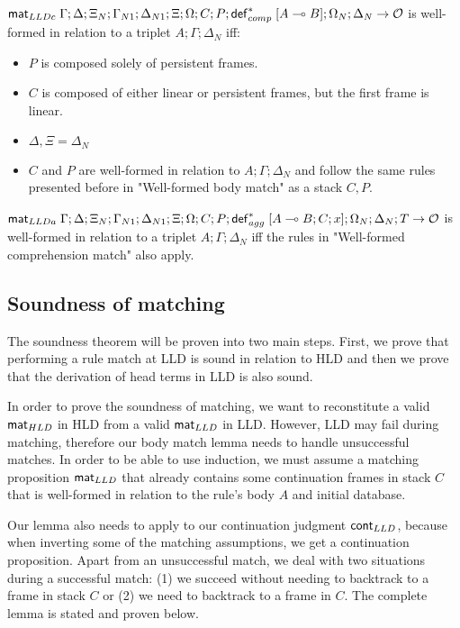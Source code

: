 \begin{definition}
$\mathsf{mat}_{LLDc} \; \Gamma; \Delta; \Xi_N; \Gamma_{N1}; \Delta_{N1}; \Xi; \Omega; C; P;
\mathsf{def}_{comp}^{*} \; [A \multimap B]; \Omega_N; \Delta_N \rightarrow \mathcal{O}$ is
well-formed in relation to a triplet $A; \Gamma; \Delta_{N}$ iff:

\begin{itemize}[leftmargin=*]
   \item $P$ is composed solely of persistent frames.
   \item $C$ is composed of either linear or persistent frames, but the first
   frame is linear.
   \item $\Delta, \Xi = \Delta_{N}$
   \item $C$ and $P$ are well-formed in relation to $A; \Gamma; \Delta_{N}$ and
   follow the same rules presented before in "Well-formed body match" as a stack
   $C, P$.
\end{itemize}
\end{definition}

\begin{definition}
$\mathsf{mat}_{LLDa} \; \Gamma; \Delta; \Xi_N; \Gamma_{N1}; \Delta_{N1}; \Xi; \Omega; C; P;
\mathsf{def}_{agg}^{*} \; [A \multimap B ; C; x]; \Omega_N; \Delta_N; T \rightarrow \mathcal{O}$ is
well-formed in relation to a triplet $A; \Gamma; \Delta_{N}$ iff the rules in
"Well-formed comprehension match" also apply.

\end{definition}


\subsection{Soundness of matching}

The soundness theorem will be proven into two main steps. First, we prove that
performing a rule match at LLD is sound in relation to HLD and then we prove
that the derivation of head terms in LLD is also sound.

In order to prove the soundness of matching, we want to reconstitute a valid
$\mathsf{mat}_{HLD} \;$in HLD from a valid $\mathsf{mat}_{LLD} \;$in LLD. However, LLD may fail during matching,
therefore our body match lemma needs to handle unsuccessful matches. In order to
be able to use induction, we must assume a matching proposition $\mathsf{mat}_{LLD} \;$that
already contains some continuation frames in stack $C$ that is well-formed in
relation to the rule's body $A$ and initial database.

Our lemma also needs to apply to our continuation judgment $\mathsf{cont}_{LLD}$, because when inverting some of
the matching assumptions, we get a continuation proposition. Apart from an unsuccessful match, we deal
with two situations during a successful match: (1) we succeed without needing to backtrack to a frame
in stack $C$ or (2) we need to backtrack to a frame in $C$. The complete lemma is stated and proven below.

